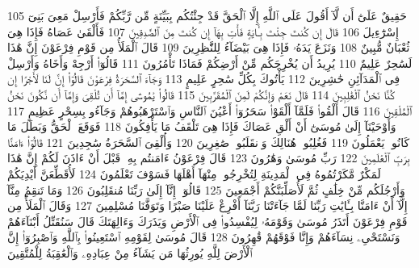 {\tiny\colorbox{cl_aya}{105}} حَقِيقٌ عَلَىٰٓ أَن لَّآ أَقُولَ عَلَى ٱللَّهِ إِلَّا ٱلْحَقَّ قَدْ جِئْتُكُم بِبَيِّنَةٍ مِّن رَّبِّكُمْ فَأَرْسِلْ مَعِىَ بَنِىٓ إِسْرَٰٓءِيلَ
{\tiny\colorbox{cl_aya}{106}} قَالَ إِن كُنتَ جِئْتَ بِـَٔايَةٍ فَأْتِ بِهَآ إِن كُنتَ مِنَ ٱلصَّٰدِقِينَ
{\tiny\colorbox{cl_aya}{107}} فَأَلْقَىٰ عَصَاهُ فَإِذَا هِىَ ثُعْبَانٌ مُّبِينٌ
{\tiny\colorbox{cl_aya}{108}} وَنَزَعَ يَدَهُۥ فَإِذَا هِىَ بَيْضَآءُ لِلنَّٰظِرِينَ
{\tiny\colorbox{cl_aya}{109}} قَالَ ٱلْمَلَأُ مِن قَوْمِ فِرْعَوْنَ إِنَّ هَٰذَا لَسَٰحِرٌ عَلِيمٌ
{\tiny\colorbox{cl_aya}{110}} يُرِيدُ أَن يُخْرِجَكُم مِّنْ أَرْضِكُمْ فَمَاذَا تَأْمُرُونَ
{\tiny\colorbox{cl_aya}{111}} قَالُوٓا۟ أَرْجِهْ وَأَخَاهُ وَأَرْسِلْ فِى ٱلْمَدَآئِنِ حَٰشِرِينَ
{\tiny\colorbox{cl_aya}{112}} يَأْتُوكَ بِكُلِّ سَٰحِرٍ عَلِيمٍ
{\tiny\colorbox{cl_aya}{113}} وَجَآءَ ٱلسَّحَرَةُ فِرْعَوْنَ قَالُوٓا۟ إِنَّ لَنَا لَأَجْرًا إِن كُنَّا نَحْنُ ٱلْغَٰلِبِينَ
{\tiny\colorbox{cl_aya}{114}} قَالَ نَعَمْ وَإِنَّكُمْ لَمِنَ ٱلْمُقَرَّبِينَ
{\tiny\colorbox{cl_aya}{115}} قَالُوا۟ يَٰمُوسَىٰٓ إِمَّآ أَن تُلْقِىَ وَإِمَّآ أَن نَّكُونَ نَحْنُ ٱلْمُلْقِينَ
{\tiny\colorbox{cl_aya}{116}} قَالَ أَلْقُوا۟ فَلَمَّآ أَلْقَوْا۟ سَحَرُوٓا۟ أَعْيُنَ ٱلنَّاسِ وَٱسْتَرْهَبُوهُمْ وَجَآءُو بِسِحْرٍ عَظِيمٍ
{\tiny\colorbox{cl_aya}{117}} وَأَوْحَيْنَآ إِلَىٰ مُوسَىٰٓ أَنْ أَلْقِ عَصَاكَ فَإِذَا هِىَ تَلْقَفُ مَا يَأْفِكُونَ
{\tiny\colorbox{cl_aya}{118}} فَوَقَعَ ٱلْحَقُّ وَبَطَلَ مَا كَانُوا۟ يَعْمَلُونَ
{\tiny\colorbox{cl_aya}{119}} فَغُلِبُوا۟ هُنَالِكَ وَٱنقَلَبُوا۟ صَٰغِرِينَ
{\tiny\colorbox{cl_aya}{120}} وَأُلْقِىَ ٱلسَّحَرَةُ سَٰجِدِينَ
{\tiny\colorbox{cl_aya}{121}} قَالُوٓا۟ ءَامَنَّا بِرَبِّ ٱلْعَٰلَمِينَ
{\tiny\colorbox{cl_aya}{122}} رَبِّ مُوسَىٰ وَهَٰرُونَ
{\tiny\colorbox{cl_aya}{123}} قَالَ فِرْعَوْنُ ءَامَنتُم بِهِۦ قَبْلَ أَنْ ءَاذَنَ لَكُمْ إِنَّ هَٰذَا لَمَكْرٌ مَّكَرْتُمُوهُ فِى ٱلْمَدِينَةِ لِتُخْرِجُوا۟ مِنْهَآ أَهْلَهَا فَسَوْفَ تَعْلَمُونَ
{\tiny\colorbox{cl_aya}{124}} لَأُقَطِّعَنَّ أَيْدِيَكُمْ وَأَرْجُلَكُم مِّنْ خِلَٰفٍ ثُمَّ لَأُصَلِّبَنَّكُمْ أَجْمَعِينَ
{\tiny\colorbox{cl_aya}{125}} قَالُوٓا۟ إِنَّآ إِلَىٰ رَبِّنَا مُنقَلِبُونَ
{\tiny\colorbox{cl_aya}{126}} وَمَا تَنقِمُ مِنَّآ إِلَّآ أَنْ ءَامَنَّا بِـَٔايَٰتِ رَبِّنَا لَمَّا جَآءَتْنَا رَبَّنَآ أَفْرِغْ عَلَيْنَا صَبْرًا وَتَوَفَّنَا مُسْلِمِينَ
{\tiny\colorbox{cl_aya}{127}} وَقَالَ ٱلْمَلَأُ مِن قَوْمِ فِرْعَوْنَ أَتَذَرُ مُوسَىٰ وَقَوْمَهُۥ لِيُفْسِدُوا۟ فِى ٱلْأَرْضِ وَيَذَرَكَ وَءَالِهَتَكَ قَالَ سَنُقَتِّلُ أَبْنَآءَهُمْ وَنَسْتَحْىِۦ نِسَآءَهُمْ وَإِنَّا فَوْقَهُمْ قَٰهِرُونَ
{\tiny\colorbox{cl_aya}{128}} قَالَ مُوسَىٰ لِقَوْمِهِ ٱسْتَعِينُوا۟ بِٱللَّهِ وَٱصْبِرُوٓا۟ إِنَّ ٱلْأَرْضَ لِلَّهِ يُورِثُهَا مَن يَشَآءُ مِنْ عِبَادِهِۦ وَٱلْعَٰقِبَةُ لِلْمُتَّقِينَ
